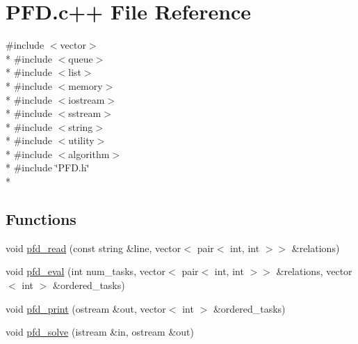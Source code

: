 \hypertarget{PFD_8c_09_09}{\section{P\-F\-D.\-c++ File Reference}
\label{PFD_8c_09_09}
}
{\ttfamily \#include $<$vector$>$}\\*
{\ttfamily \#include $<$queue$>$}\\*
{\ttfamily \#include $<$list$>$}\\*
{\ttfamily \#include $<$memory$>$}\\*
{\ttfamily \#include $<$iostream$>$}\\*
{\ttfamily \#include $<$sstream$>$}\\*
{\ttfamily \#include $<$string$>$}\\*
{\ttfamily \#include $<$utility$>$}\\*
{\ttfamily \#include $<$algorithm$>$}\\*
{\ttfamily \#include \char`\"{}P\-F\-D.\-h\char`\"{}}\\*
\subsection*{Functions}
\begin{DoxyCompactItemize}
\item 
void \hyperlink{PFD_8c_09_09_aed19543fa1f0fa11289ecbba54a43334}{pfd\-\_\-read} (const string \&line, vector$<$ pair$<$ int, int $>$$>$ \&relations)
\item 
void \hyperlink{PFD_8c_09_09_a6ad321f0cdec4aa4f1bda91174b3b6ea}{pfd\-\_\-eval} (int num\-\_\-tasks, vector$<$ pair$<$ int, int $>$$>$ \&relations, vector$<$ int $>$ \&ordered\-\_\-tasks)
\item 
void \hyperlink{PFD_8c_09_09_a0d446917c4046f40c8cdcbf6f712312b}{pfd\-\_\-print} (ostream \&out, vector$<$ int $>$ \&ordered\-\_\-tasks)
\item 
void \hyperlink{PFD_8c_09_09_a6584b134df3d4e68732be7089136c17e}{pfd\-\_\-solve} (istream \&in, ostream \&out)
\end{DoxyCompactItemize}


